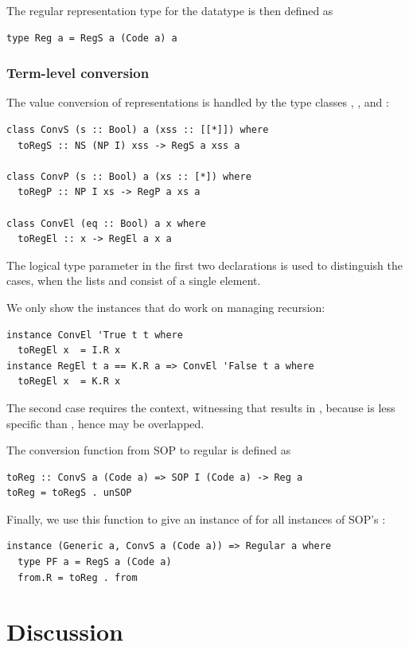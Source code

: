 \documentclass[sigplan,screen,review,anonymous]{acmart}
\begin{document}
The \textsf{regular} representation type for the datatype  is then defined as
\begin{lstlisting}[style=fancy]
type Reg a = RegS a (Code a) a
\end{lstlisting}

\subsubsection{Term-level conversion}

The value conversion of representations is handled by the type classes , , and :
\begin{lstlisting}[style=fancy]
class ConvS (s :: Bool) a (xss :: [[*]]) where
  toRegS :: NS (NP I) xss -> RegS a xss a

class ConvP (s :: Bool) a (xs :: [*]) where
  toRegP :: NP I xs -> RegP a xs a

class ConvEl (eq :: Bool) a x where
  toRegEl :: x -> RegEl a x a
\end{lstlisting}
The logical type parameter  in the first two declarations is used to distinguish the cases, when the lists  and  consist of a single element.

We only show the  instances that do work on managing recursion:
\begin{lstlisting}[style=fancy]
instance ConvEl 'True t t where
  toRegEl x  = I.R x
instance RegEl t a == K.R a => ConvEl 'False t a where
  toRegEl x  = K.R x
\end{lstlisting}
The second case requires the context, witnessing that  results in , because  is less specific than , hence may be overlapped.

The conversion function from SOP to \textsf{regular} is defined as
\begin{lstlisting}[style=fancy]
toReg :: ConvS a (Code a) => SOP I (Code a) -> Reg a
toReg = toRegS . unSOP
\end{lstlisting}

Finally, we use this function to give an instance of  for all instances of SOP's :
\begin{lstlisting}[style=fancy]
instance (Generic a, ConvS a (Code a)) => Regular a where
  type PF a = RegS a (Code a)
  from.R = toReg . from
\end{lstlisting}


\section{Discussion}
\label{sec:discussion}
\end{document}
